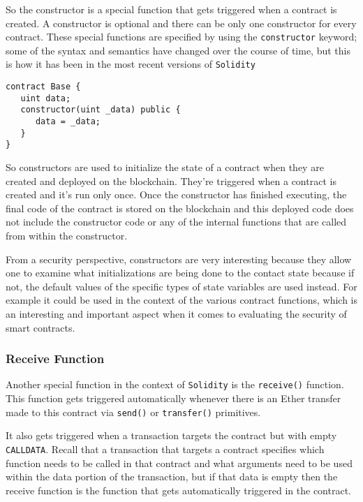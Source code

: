 So the constructor is a special function that gets triggered when a
contract is created. A constructor is optional and there can be only one
constructor for every contract. These special functions are specified by
using the \texttt{constructor} keyword; some of the syntax and semantics
have changed over the course of time, but this is how it has been in the
most recent versions of \texttt{Solidity}

\begin{lstlisting}[language=Solidity,numbers=none]
contract Base {
   uint data;
   constructor(uint _data) public {
      data = _data;   
   }
}
\end{lstlisting}

So constructors are used to initialize the state of a contract when they
are created and deployed on the blockchain. They're triggered when a
contract is created and it's run only once. Once the constructor has
finished executing, the final code of the contract is stored on the
blockchain and this deployed code does not include the constructor code
or any of the internal functions that are called from within the
constructor.

From a security perspective, constructors are very interesting because
they allow one to examine what initializations are being done to the
contact state because if not, the default values of the specific types
of state variables are used instead. For example it could be used in the
context of the various contract functions, which is an interesting and
important aspect when it comes to evaluating the security of smart
contracts.

\subsubsection{Receive Function}\label{receive-function}

Another special function in the context of \texttt{Solidity} is the
\texttt{receive()} function. This function gets triggered automatically
whenever there is an Ether transfer made to this contract via
\texttt{send()} or \texttt{transfer()} primitives.

It also gets triggered when a transaction targets the contract but with
empty \texttt{CALLDATA}. Recall that a transaction that targets a
contract specifies which function needs to be called in that contract
and what arguments need to be used within the data portion of the
transaction, but if that data is empty then the receive function is the
function that gets automatically triggered in the contract.

